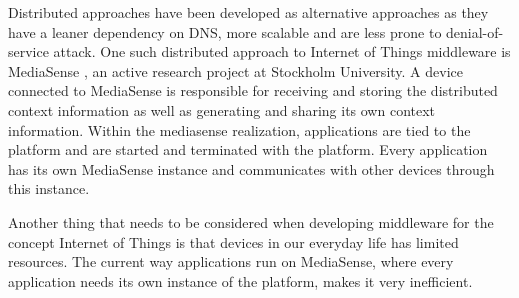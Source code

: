 Distributed approaches have been developed as alternative approaches as they have a leaner dependency on DNS, more scalable and are less prone to denial-of-service attack. One such distributed approach to Internet of Things middleware is MediaSense \cite{Kanter539187}, an active research project at Stockholm University. A device connected to MediaSense is responsible for receiving and storing the distributed context information as well as generating and sharing its own context information. Within the mediasense realization, applications are tied to the platform and are started and terminated with the platform. Every application has its own MediaSense instance and communicates with other devices through this instance.

Another thing that needs to be considered when developing middleware for the concept Internet of Things is that devices in our everyday life has limited resources. The current way applications run on MediaSense, where every application needs its own instance of the platform, makes it very inefficient.